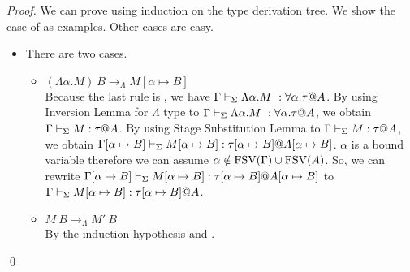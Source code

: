 \begin{proof}
	We can prove using induction on the type derivation tree.
	We show the case of \TIns{}{} as examples.
	Other cases are easy.
	\begin{itemize}
		\newcommand{\R}{\longrightarrow_{\Lambda}}
		\item \TIns
		      		      	      	      	      	      	      	      	      	      		      	      	      	      
		      There are two cases.
		      \begin{itemize}
		      	\item $(\Lambda\alpha.M)\ B \R M[\alpha \mapsto B]$\\
					Because the last rule is \TIns{}, we have $\Gamma \vdash_\Sigma \Lambda\alpha.M\ : \forall\alpha.\tau @ A$.
		      	    By using Inversion Lemma for $\Lambda$ type to $\Gamma \vdash_\Sigma \Lambda\alpha.M\ : \forall\alpha.\tau @ A$,
		      	    we obtain $\Gamma \vdash_\Sigma M : \tau @ A$.
		      	    By using Stage Substitution Lemma to $\Gamma \vdash_\Sigma M : \tau @ A$,
					we obtain $\Gamma[\alpha \mapsto B] \vdash_\Sigma M[\alpha \mapsto B] : \tau[\alpha \mapsto B] @ A[\alpha \mapsto B]$.
					$\alpha$ is a bound variable therefore we can assume $\alpha \notin \text{FSV}(\Gamma) \cup \text{FSV}(A)$.
		      	    So, we can rewrite $\Gamma[\alpha \mapsto B] \vdash_\Sigma M[\alpha \mapsto B] : \tau[\alpha \mapsto B] @ A[\alpha \mapsto B]$ to
		      	    $\Gamma \vdash_\Sigma M[\alpha \mapsto B] : \tau[\alpha \mapsto B] @ A$.
		      	\item $M\ B \R M'\ B$\\
		      	      By the induction hypothesis and \TIns.
		      \end{itemize}
	\end{itemize}
\qed\end{proof}
	
